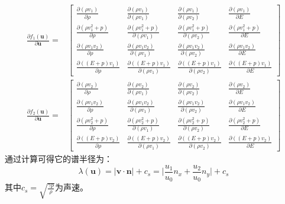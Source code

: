 \documentclass[a4paper, 12pt, UTF8]{ctexart}
\newcommand{\bs}[1]{\boldsymbol{#1}}
\begin{document}
\begin{equation}
\begin{split}
		\frac{\partial f_1(\bs{u})}{\partial \bs{u}}=&\begin{bmatrix}
		\frac{\partial(\rho v_1)}{\partial\rho} & \frac{\partial(\rho v_1)}{\partial(\rho v_1)} & \frac{\partial(\rho v_1)}{\partial(\rho v_2)}& \frac{\partial(\rho v_1)}{\partial E}\\
		\frac{\partial(\rho v_1^2+p)}{\partial\rho} & \frac{\partial(\rho v_1^2+p)}{\partial(\rho v_1)} & \frac{\partial(\rho v_1^2+p)}{\partial(\rho v_2)}& \frac{\partial(\rho v_1^2+p)}{\partial E}\\
		\frac{\partial(\rho v_1v_2)}{\partial\rho} & \frac{\partial(\rho v_1v_2)}{\partial(\rho v_1)} & \frac{\partial(\rho v_1v_2)}{\partial(\rho v_2)}& \frac{\partial(\rho v_1v_2)}{\partial E}\\
		\frac{\partial((E+p) v_1)}{\partial\rho} & \frac{\partial((E+p)  v_1)}{\partial(\rho v_1)} & \frac{\partial((E+p) v_1)}{\partial(\rho v_2)}& \frac{\partial((E+p)  v_1)}{\partial E}
	\end{bmatrix}\\
	\frac{\partial f_2(\bs{u})}{\partial \bs{u}}=&\begin{bmatrix}
		\frac{\partial(\rho v_2)}{\partial\rho} & \frac{\partial(\rho v_2)}{\partial(\rho v_1)} & \frac{\partial(\rho v_2)}{\partial(\rho v_2)}& \frac{\partial(\rho v_2)}{\partial E}\\
		\frac{\partial(\rho v_1v_2)}{\partial\rho} & \frac{\partial(\rho v_1v_2)}{\partial(\rho v_1)} & \frac{\partial(\rho v_1v_2)}{\partial(\rho v_2)}& \frac{\partial(\rho v_1v_2)}{\partial E}\\
		\frac{\partial(\rho v_2^2+p)}{\partial\rho} & \frac{\partial(\rho v_2^2+p)}{\partial(\rho v_1)} & \frac{\partial(\rho v_2^2+p)}{\partial(\rho v_2)}& \frac{\partial(\rho v_2^2+p)}{\partial E}\\
		\frac{\partial((E+p) v_2)}{\partial\rho} & \frac{\partial((E+p)  v_2)}{\partial(\rho v_1)} & \frac{\partial((E+p) v_2)}{\partial(\rho v_2)}& \frac{\partial((E+p)  v_2)}{\partial E}
	\end{bmatrix}
\end{split}
\end{equation}
通过计算可得它的谱半径为：
\begin{equation}\label{spectralradius}
{\lambda}(\bs{u})=|\bs{v} \cdot \bs{n}|+c_{s}=\Big|\frac{u_1}{u_0}n_x+\frac{u_2}{u_0}n_y\Big|+c_s
\end{equation}
其中$\displaystyle c_{s}=\sqrt{\frac{\gamma{p}}{\rho}}$为声速。
\end{document}
